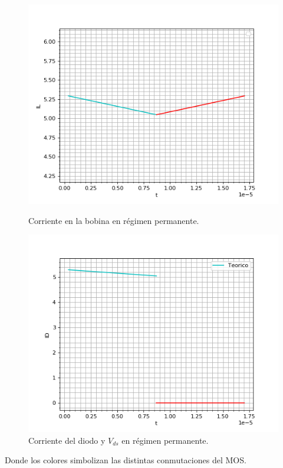 \begin{figure}[]
	\centering
	\begin{minipage}{0.495\textwidth}
		\centering
		\includegraphics[width=\textwidth]{ImagenesEjercicio-1/IL_permanente} %
		\caption{Corriente en la bobina en régimen permanente.}
		\label{ej1:fig:il_permanente}
	\end{minipage}\hfill
	\begin{minipage}{0.495\textwidth}
		\centering
		\includegraphics[width=\textwidth]{ImagenesEjercicio-1/ID_apagado_a_encendido} %
		\caption{Corriente del diodo y $V_{ds}$ en régimen permanente.}
		\label{ej1:fig:idiodo_permanente}
	\end{minipage}
\end{figure}
Donde los colores simbolizan las distintas conmutaciones del MOS.
